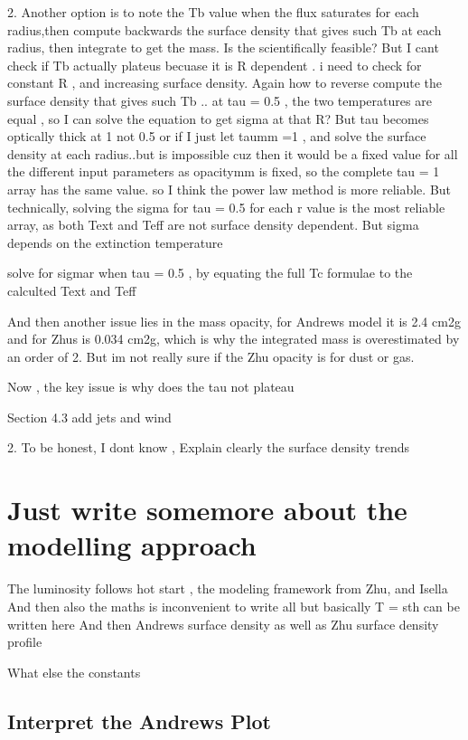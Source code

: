 \documentclass{article}
\begin{document}
2. Another option is to note the Tb value when the  flux saturates for each radius,then compute backwards the surface density that gives such Tb at each radius, then integrate to get the mass.
Is the scientifically feasible?  But I cant check if Tb actually plateus becuase it is R dependent . i need to check for constant R , and increasing surface density. 
Again how to reverse compute the surface density that gives such Tb .. at tau = 0.5 , the two temperatures are equal , so I can solve the equation to get sigma at that R? 
But tau becomes optically thick at 1 not 0.5 
or if I just let taumm =1 , and solve the surface density at each radius..but is impossible cuz then it would be a fixed value for all the different input parameters as opacitymm is fixed, so the complete tau = 1 array has the same value.
so I think the power law method is more reliable.
But technically, solving the sigma for tau = 0.5 for each r value is the most reliable array, as both Text and Teff are not surface density dependent.
But sigma depends on the extinction temperature 

solve for sigmar when tau = 0.5 , by equating the full Tc formulae to the calculted Text and Teff

And then another issue lies in the mass opacity, for Andrews model it is 2.4 cm2g and for Zhus is 0.034 cm2g, which is why the integrated mass is overestimated by an order of 2.
But im not really sure if the Zhu opacity is for dust or gas. 


Now , the key issue is why does the tau not plateau 


Section 4.3 add jets and wind 

2. To be honest, I dont know ,
Explain clearly the surface density trends


\section{Just write somemore about the modelling approach}

The luminosity follows hot start , the modeling framework from Zhu, and Isella
And then also the maths is inconvenient to write all 
but basically T = sth can be written here
And then Andrews surface density as well as Zhu surface density profile

What else the constants 


\subsection{Interpret the Andrews Plot}
\end{document}
